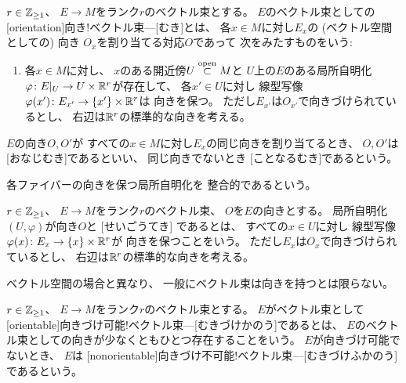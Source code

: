 \documentclass[report]{jlreq}
\begin{document}
\begin{definition}
    $r \in \mathbb{Z}_{\ge 1}$、
    $E \to M$をランク$r$のベクトル束とする。
    $E$のベクトル束としての
    [orientation]{向き!ベクトル束---}[むき]とは、
    各$x \in M$に対し$E_x$の (ベクトル空間としての) 向き
    $O_x$を割り当てる対応$O$であって
    次をみたすものをいう:
    \begin{enumerate}
        \item 各$x \in M$に対し、
            $x$のある開近傍$U \stackrel{\text{open}}{\subset} M$と
            $U$上の$E$のある局所自明化$\varphi \colon E|_U \to U \times \mathbb{R}^r$が存在して、
            各$x' \in U$に対し
            線型写像$\varphi(x') \colon E_{x'} \to \{ x' \} \times \mathbb{R}^r$は
            向きを保つ。
            ただし$E_{x'}$は$O_{x'}$で向きづけられているとし、
            右辺は$\mathbb{R}^r$の標準的な向きを考える。
    \end{enumerate}
    $E$の向き$O, O'$が
    すべての$x \in M$に対し$E_x$の同じ向きを割り当てるとき、
    $O, O'$は
    [おなじむき]であるといい、
    同じ向きでないとき
    [ことなるむき]であるという。
\end{definition}

各ファイバーの向きを保つ局所自明化を
整合的であるという。

\begin{definition}[整合的な局所自明化]
    $r \in \mathbb{Z}_{\ge 1}$、
    $E \to M$をランク$r$のベクトル束、
    $O$を$E$の向きとする。
    局所自明化$(U, \varphi)$が向き$O$と
    [せいごうてき]
    であるとは、
    すべての$x \in U$に対し
    線型写像$\varphi(x) \colon E_{x} \to \{ x \} \times \mathbb{R}^r$が
    向きを保つことをいう。
    ただし$E_{x}$は$O_{x}$で向きづけられているとし、
    右辺は$\mathbb{R}^r$の標準的な向きを考える。
\end{definition}

ベクトル空間の場合と異なり、
一般にベクトル束は向きを持つとは限らない。

\begin{definition}[ベクトル束の向きづけ可能性]
    $r \in \mathbb{Z}_{\ge 1}$、
    $E \to M$をランク$r$のベクトル束とする。
    $E$がベクトル束として
    [orientable]{向きづけ可能!ベクトル束---}[むきづけかのう]であるとは、
    $E$のベクトル束としての向きが少なくともひとつ存在することをいう。
    $E$が向きづけ可能でないとき、
    $E$は
    [nonorientable]{向きづけ不可能!ベクトル束---}[むきづけふかのう]
    であるという。
\end{definition}
\end{document}
